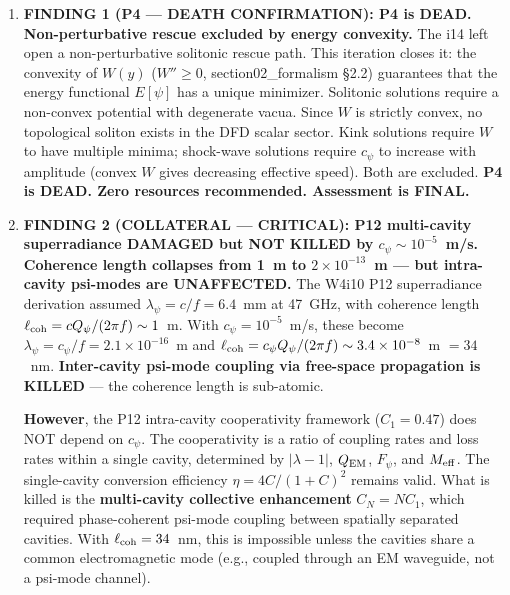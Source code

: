 \documentclass[11pt]{article}
\newcommand{\ee}[1]{\times 10^{#1}}
\newcommand{\Meff}{M_{\rm eff}}
\newcommand{\lambdaone}{|\lambda{-}1|}
\newcommand{\Qpsi}{Q_\psi}
\newcommand{\QEM}{Q_{\rm EM}}
\newcommand{\Fpsi}{F_\psi}
\begin{document}
\begin{tcolorbox}[colback=blue!5!white, colframe=blue!60!black,
  title=\textbf{W4i15 TOP 5 FINDINGS --- Ranked by Programme Impact}]

\begin{enumerate}

\item \textbf{FINDING 1 (P4 --- DEATH CONFIRMATION): P4 is DEAD.
  Non-perturbative rescue excluded by energy convexity.}
  The i14 left open a non-perturbative solitonic rescue path.
  This iteration closes it: the convexity of $W(y)$ ($W'' \geq 0$,
  section02\_formalism \S2.2) guarantees that the energy functional
  $E[\psi]$ has a unique minimizer. Solitonic solutions require a
  non-convex potential with degenerate vacua. Since $W$ is strictly
  convex, no topological soliton exists in the DFD scalar sector.
  Kink solutions require $W$ to have multiple minima; shock-wave
  solutions require $c_\psi$ to increase with amplitude (convex $W$
  gives decreasing effective speed). Both are excluded.
  \textbf{P4 is DEAD. Zero resources recommended. Assessment is FINAL.}

\item \textbf{FINDING 2 (COLLATERAL --- CRITICAL): P12 multi-cavity
  superradiance DAMAGED but NOT KILLED by $c_\psi \sim 10^{-5}$~m/s.
  Coherence length collapses from 1~m to $2\ee{-13}$~m --- but
  intra-cavity psi-modes are UNAFFECTED.}
  The W4i10 P12 superradiance derivation assumed
  $\lambda_\psi = c/f = 6.4$~mm at 47~GHz, with coherence length
  $\ell_{\rm coh} = c\Qpsi/(2\pi f) \sim 1$~m. With $c_\psi = 10^{-5}$~m/s,
  these become $\lambda_\psi = c_\psi/f = 2.1\ee{-16}$~m and
  $\ell_{\rm coh} = c_\psi\Qpsi/(2\pi f) \sim 3.4\ee{-8}$~m $= 34$~nm.
  \textbf{Inter-cavity psi-mode coupling via free-space propagation
  is KILLED} --- the coherence length is sub-atomic.

  \textbf{However}, the P12 intra-cavity cooperativity framework
  ($C_1 = 0.47$) does NOT depend on $c_\psi$. The cooperativity
  is a ratio of coupling rates and loss rates within a single cavity,
  determined by $\lambdaone$, $\QEM$, $\Fpsi$, and $\Meff$. The
  single-cavity conversion efficiency $\eta = 4C/(1+C)^2$ remains valid.
  What is killed is the \textbf{multi-cavity collective enhancement}
  $C_N = NC_1$, which required phase-coherent psi-mode coupling
  between spatially separated cavities. With $\ell_{\rm coh} = 34$~nm,
  this is impossible unless the cavities share a common electromagnetic
  mode (e.g., coupled through an EM waveguide, not a psi-mode channel).


\end{enumerate}
\end{tcolorbox}
\end{document}
